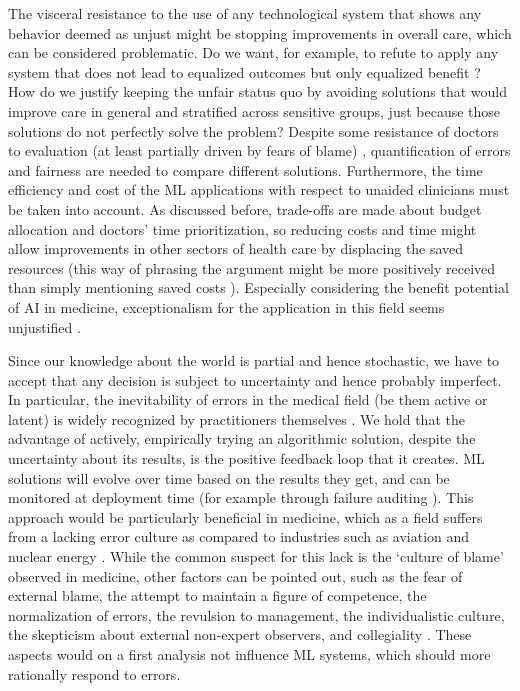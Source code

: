     The visceral resistance to the use of any technological system that shows any behavior deemed as unjust might be stopping improvements in overall care, which can be considered problematic.
    Do we want, for example, to refute to apply any system that does not lead to equalized outcomes but only equalized benefit \cite{Rajkomar2018}?
    How do we justify keeping the unfair status quo by avoiding solutions that would improve care in general and stratified across sensitive groups, just because those solutions do not perfectly solve the problem?
    Despite some resistance of doctors to evaluation (at least partially driven by fears of blame) \cite{Waring2005}, quantification of errors and fairness are needed to compare different solutions.
    Furthermore, the time efficiency and cost of the ML applications with respect to unaided clinicians must be taken into account.
    As discussed before, trade-offs are made about budget allocation and doctors' time prioritization, so reducing costs and time might allow improvements in other sectors of health care by displacing the saved resources (this way of phrasing the argument might be more positively received than simply mentioning saved costs \cite{Tetlock2003}).
    Especially considering the benefit potential of AI in medicine, exceptionalism for the application in this field seems unjustified \cite{Fletcher2021}.

    Since our knowledge about the world is partial and hence stochastic, we have to accept that any decision is subject to uncertainty and hence probably imperfect.
    In particular, the inevitability of errors in the medical field (be them active or latent) is widely recognized by practitioners themselves \cite{Waring2005}.
    We hold that the advantage of actively, empirically trying an algorithmic solution, despite the uncertainty about its results, is the positive feedback loop that it creates.
    ML solutions will evolve over time based on the results they get, and can be monitored at deployment time (for example through failure auditing \cite{Chen2021}).
    This approach would be particularly beneficial in medicine, which as a field suffers from a lacking error culture as compared to industries such as aviation and nuclear energy \cite{Waring2005}.
    While the common suspect for this lack is the `culture of blame' observed in medicine, other factors can be pointed out, such as the fear of external blame, the attempt to maintain a figure of competence, the normalization of errors, the revulsion to management, the individualistic culture, the skepticism about external non-expert observers, and collegiality \cite{Waring2005}.
    These aspects would on a first analysis not influence ML systems, which should more rationally respond to errors.

